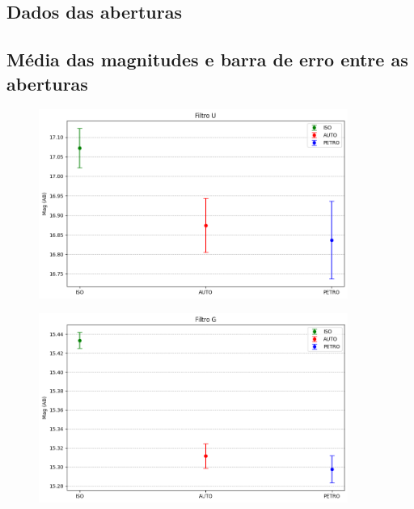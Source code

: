 \begin{anexosenv}
\chapter{Dados das aberturas} \label{chap:dados_amostra}
\section{Média das magnitudes e barra de erro entre as aberturas}

    \begin{figure}[h]
        \centering
        \includegraphics[width=0.9\textwidth]{Imagens/incerteza_abertura.png} 
        \caption[]{}
        \label{fig:u_incerteza_abertura} 
    \end{figure}

    \begin{figure}[h]
        \centering
        \includegraphics[width=0.9\textwidth]{Imagens/incerteza_abertura_g.png} 
        \caption[]{}
        \label{fig:incerteza_abertura_g} 
    \end{figure}


\end{anexosenv}

